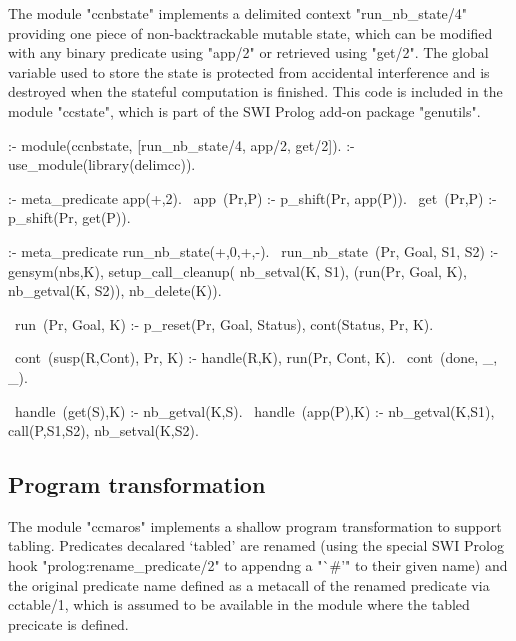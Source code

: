 The module "ccnbstate" implements a delimited context "run_nb_state/4"
providing one piece of non-backtrackable mutable state, which can be modified with any binary predicate
using "app/2" or retrieved using "get/2". The global variable used to store the state
is protected from accidental interference and is destroyed when the stateful
computation is finished. This code is included in the module "ccstate", which 
is part of the SWI Prolog add-on package "genutils".
\begin{prolog-framed}[name=ccnbstate]
  :- module(ccnbstate, [run_nb_state/4, app/2, get/2]).
  :- use_module(library(delimcc)).

  :- meta_predicate app(+,2).
  ~app~(Pr,P) :- p_shift(Pr, app(P)).
  ~get~(Pr,P) :- p_shift(Pr, get(P)).

  :- meta_predicate run_nb_state(+,0,+,-).
  ~run_nb_state~(Pr, Goal, S1, S2) :-
     gensym(nbs,K),
     setup_call_cleanup( nb_setval(K, S1),
                         (run(Pr, Goal, K), nb_getval(K, S2)),
                         nb_delete(K)).

  ~run~(Pr, Goal, K) :- p_reset(Pr, Goal, Status), cont(Status, Pr, K).

  ~cont~(susp(R,Cont), Pr, K) :- handle(R,K), run(Pr, Cont, K).
  ~cont~(done, _, _).

  ~handle~(get(S),K) :- nb_getval(K,S).
  ~handle~(app(P),K) :- nb_getval(K,S1), call(P,S1,S2), nb_setval(K,S2).
\end{prolog-framed}

\subsection{Program transformation}
\label{sec:ccmacros}

The module "ccmaros" implements a shallow program transformation to support
tabling. Predicates decalared `tabled' are renamed (using the special
SWI Prolog hook "prolog:rename_predicate/2" to appendng
a "`#'" to their given name) and the original predicate name defined
as a metacall of the renamed predicate via cctable/1, which is 
assumed to be available in the module where the tabled precicate
is defined. 

